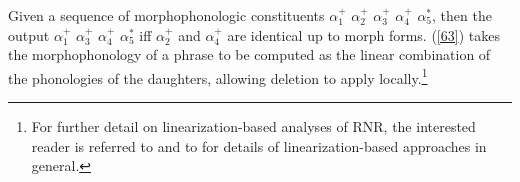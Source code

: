 {Given a sequence of morphophonologic constituents $\alpha_{1}^{+}$ $\alpha_{2}^{+}$ $\alpha_{3}^{+}$ $\alpha_{4}^{+}$ $\alpha_{5}^{*}$, then the output
$\alpha_{1}^{+}$ $\alpha_{3}^{+}$ $\alpha_{4}^{+}$ $\alpha_{5}^{*}$
iff $\alpha_{2}^{+}$ and $\alpha_{4}^{+}$ are identical up to morph forms.
\z
(\ref{63}) takes the morphophonology of a phrase to be computed as the linear combination of the phonologies of the daughters, allowing deletion to apply locally.\footnote{For further detail on linearization-based analyses of RNR, the interested reader is referred to \citet{Yatabe2001, Yatabe2012} and to  for details of linearization-based approaches in general.}



\iffalse{
\citeauthor{Chaves2014}' (\citeyear[874]{Chaves2014}) constraint licensing true RNR is given in \ref{bpd}. It permits the M(orpho)P(honology) feature of the mother to contain only one instance (represented as $L_{3}$ in (\ref{63})) of the two morphophonologically identical sequences [FORM $F_{1}$], \ldots, [FORM $F_{n}$] present in the daughters; the leftmost of these sequences undergoes deletion. The final list in the mother, $L_{4}$, may be empty or nonempty, depending on whether RNRaised material is discontinuous.
%



\ea
\label{bpd}
Backward periphery deletion construction:\\
\avmtmp{\small
[\type*{phrase}
  mp $L_{1}$:\type{ne-list} $\bigcirc L_{2}$:\type{ne-list} $\bigcirc L_{3} \bigcirc L_{4}$ & ]
} $\to$
\avmtmp{
 [ \type*{phrase}
    mp $L_{1} \bigcirc$ < [ form $F_{1}$ ], \ldots, [ form $F_{n}$ ] > $\bigcirc L_{2} \bigcirc L_{3}:$%
     <[ form $F_{1}$ ], \ldots, [form $F_{n}$ ] > $\bigcirc L_{4}$ & ]
}
\z
}\fi

}
